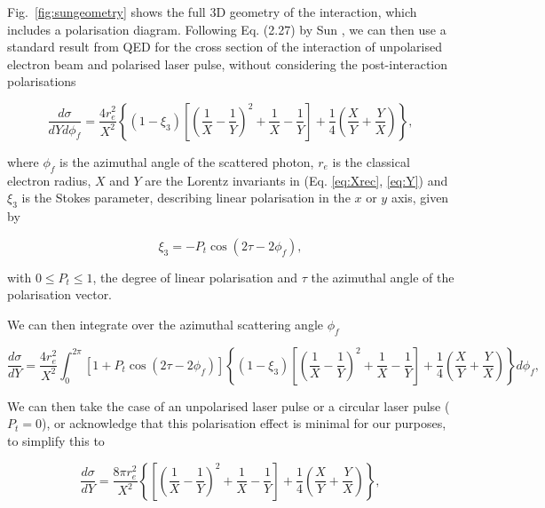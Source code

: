\documentclass[10pt]{article}
\begin{document}
Fig.~\ref{fig:sungeometry} shows the full 3D geometry of the interaction, which includes a polarisation diagram. Following Eq. (2.27) by Sun \cite{sun2009characterizations}, we can then use a standard result from QED for the cross section of the interaction of unpolarised electron beam and polarised laser pulse, without considering the post-interaction polarisations \cite{grozin2002complete} 

\begin{equation}
\frac{d\sigma}{dYd\phi_{f}} = \frac{4r_{e}^{2}}{X^{2}}\left\{\left(1-\xi_{3}\right)\left[\left(\frac{1}{X}-\frac{1}{Y}\right)^{2}+\frac{1}{X}-\frac{1}{Y}\right]+\frac{1}{4}\left(\frac{X}{Y}+\frac{Y}{X}\right)\right\},
\label{eq:DiffCrossYphif}
\end{equation}

where $\phi_{f}$ is the azimuthal angle of the scattered photon, $r_{e}$ is the classical electron radius, $X$ and $Y$ are the Lorentz invariants in (Eq. \ref{eq:Xrec}, \ref{eq:Y}) and $\xi_{3}$ is the Stokes parameter, describing linear polarisation in the $x$ or $y$ axis, given by

\begin{equation}
\xi_{3} = -P_{t}\cos\left(2\tau-2\phi_{f}\right),
\label{eq:Stokes3}
\end{equation} 

with $0 \leq P_{t} \leq 1$, the degree of linear polarisation and $\tau$ the azimuthal angle of the polarisation vector. 

We can then integrate over the azimuthal scattering angle $\phi_{f}$

\begin{equation}
\frac{d\sigma}{dY} = \frac{4r_{e}^{2}}{X^{2}}\int_{0}^{2\pi}\left[1+P_{t}\cos\left(2\tau-2\phi_{f}\right)\right]\left\{\left(1-\xi_{3}\right)\left[\left(\frac{1}{X}-\frac{1}{Y}\right)^{2}+\frac{1}{X}-\frac{1}{Y}\right]+\frac{1}{4}\left(\frac{X}{Y}+\frac{Y}{X}\right)\right\} d\phi_{f}, 
\label{eq:phifintegral}
\end{equation}

We can then take the case of an unpolarised laser pulse or a circular laser pulse ($P_{t} = 0$), or acknowledge that this polarisation effect is minimal for our purposes, to simplify this to

\begin{equation}
\frac{d\sigma}{dY} = \frac{8\pi r_{e}^{2}}{X^{2}}\left\{\left[\left(\frac{1}{X}-\frac{1}{Y}\right)^{2}+\frac{1}{X}-\frac{1}{Y}\right]+\frac{1}{4}\left(\frac{X}{Y}+\frac{Y}{X}\right)\right\},
\label{eq:BerestetskiiForm}
\end{equation}
\end{document}
